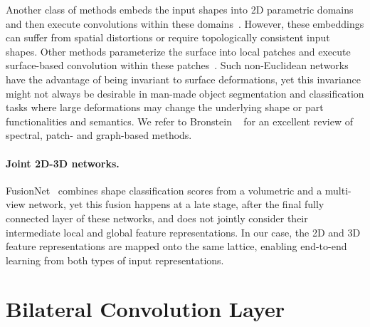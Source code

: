 \documentclass[10pt,twocolumn,letterpaper]{article}
\newcommand{\vjcomment}[1]{{\bf \textcolor{red}{VJ: #1}}}
\begin{document}
 Another class of methods embeds the input shapes into 2D parametric domains and then execute convolutions within these domains~\cite{Sinha2016,Maron2017CNN,Ezuz2017}. However, these embeddings can suffer from spatial distortions or require topologically consistent input shapes. Other methods parameterize the surface into local patches and execute surface-based convolution within these patches~\cite{masci2015geodesic,Boscaini2016,Monti2017}. Such non-Euclidean networks have the advantage of being invariant to surface deformations, yet this invariance might not always be desirable in man-made object segmentation and classification tasks where large deformations may change the underlying shape or part functionalities and semantics. We refer to Bronstein \etal~\cite{bronstein2017geometric} for an excellent review of spectral, patch- and graph-based methods.

\vspace{-0.35cm}\paragraph{Joint 2D-3D networks.} FusionNet~\cite{hedge2016fusionnet} combines shape classification scores from a volumetric and a multi-view network, yet this fusion happens at a late stage, after the final fully connected layer of these networks, and does not jointly consider their intermediate local and global feature representations. In our case, the 2D and 3D feature representations are mapped onto the same lattice, enabling end-to-end learning from both types of input representations.


\section{Bilateral Convolution Layer}\label{sec:review_bcl}
\end{document}
